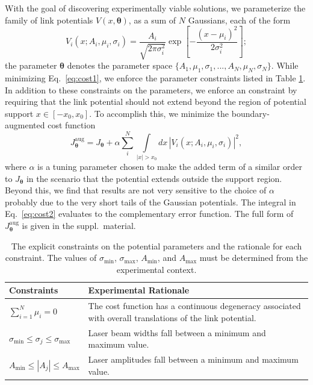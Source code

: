 \documentclass[twocolumn,amsmath,amssymb,showpacs,prl,superscriptaddress,aps]{revtex4-1}
\begin{document}
With the goal of discovering experimentally viable solutions, we parameterize the family of link potentials $V(x, \bm{\theta})$, as a sum of $N$ Gaussians, each of the form
\begin{equation}\label{eq:V-param}
V_i(x; A_i, \mu_i, \sigma_i) = \frac{A_i}{\sqrt{2\pi\sigma_i^2}}\exp\left[{-\frac{(x-\mu_i)^2}{2\sigma_i^2}}\right];
\end{equation}
the parameter $\bm{\theta}$ denotes the parameter space $\{A_1, \mu_1, \sigma_1,...,A_N, \mu_N, \sigma_N\}$. While minimizing Eq.~\eqref{eq:cost1}, we enforce the parameter constraints listed in Table \ref{tab:constraints}. In addition to these constraints on the parameters, we enforce an constraint by requiring that the link potential should not extend beyond the region of potential support $x\in[-x_0,x_0]$. 
To accomplish this, we minimize the boundary-augmented cost function
\begin{equation}\label{eq:cost2}
  J_{\bm{\theta}}^{\mathrm{aug}} = J_{\bm{\theta}} + \alpha \sum_i^N\int\limits_{|x|>x_0}dx\,|V_i(x; A_i,\mu_i,\sigma_i)|^2,
\end{equation}
where $\alpha$ is a tuning parameter chosen to make the added term of a similar order to $J_{\mathbf{\theta}}$ in the scenario that the potential extends outside the support region. Beyond this, we find that results are not very sensitive to the choice of $\alpha$ probably due to the very short tails of the Gaussian potentials. The integral in Eq.~\eqref{eq:cost2} evaluates to the complementary error function. The full form of $J_{\bm{\theta}}^{\mathrm{aug}}$ is given in the suppl.~material.

\begin{table}[t]
  \renewcommand*{\arraystretch}{1.4}
  \begin{tabular}{m{3cm}|m{5.5cm}}
    Constraints & Experimental Rationale \\
    \hline\hline
    $\sum_{i=1}^{N}\mu_i = 0$ & The cost function has a continuous degeneracy associated with overall translations of the link potential. \\
    \hline
    $\sigma_{\mathrm{min}} \leq \sigma_j \leq \sigma_{\mathrm{max}} $ & Laser beam widths fall between a minimum and maximum value.\\
    \hline
    $A_{\mathrm{min}} \leq |A_j| \leq A_{\mathrm{max}}$ & Laser amplitudes fall between a minimum and maximum value.
  \end{tabular}
  \caption{The explicit constraints on the potential parameters and the rationale for each constraint. The values of $\sigma_{\mathrm{min}}$, $\sigma_{\mathrm{max}}$, $A_{\mathrm{min}}$, and $A_{\mathrm{max}}$ must be determined from the experimental context.}
  \label{tab:constraints}
\end{table}
\end{document}
